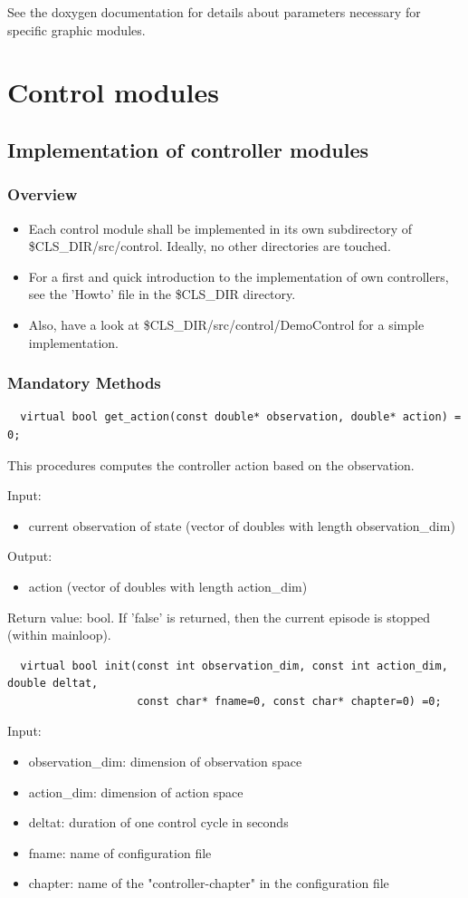 \documentclass[a4paper,12pt,german]{article}
\newcommand{\clsdir}{{\$CLS\_DIR}}
\newcommand{\ite}{\begin{itemize}}
\newcommand{\eti}{\end{itemize}}
\begin{document}
See the doxygen documentation for details about parameters necessary for specific graphic modules.


\section{Control modules}



\subsection{Implementation of controller modules}

\subsubsection{Overview}

\ite
\item Each control module shall be implemented in its own subdirectory of \clsdir/src/control.
Ideally, no other directories are touched.
\item For a first and quick introduction to the implementation of own controllers, 
see the 'Howto' file in the \clsdir{ }  directory.
\item Also, have a look at \clsdir/src/control/DemoControl for a simple implementation.
\eti

\subsubsection{Mandatory Methods}

\begin{verbatim}
  virtual bool get_action(const double* observation, double* action) = 0;
\end{verbatim}

This procedures computes the controller action based on the observation.


Input:
\ite
\item current observation of state (vector of doubles with length observation\_dim)
\eti

Output:
\ite
\item  action (vector of doubles with length action\_dim)
\eti

Return value: bool. If 'false' is returned, then the current episode is stopped (within mainloop).


\begin{verbatim}
  virtual bool init(const int observation_dim, const int action_dim, double deltat, 
                    const char* fname=0, const char* chapter=0) =0;
\end{verbatim}
Input:
\ite
\item observation\_dim: dimension of observation space
\item action\_dim: dimension of action space
\item deltat: duration of one control cycle in seconds
\item fname: name of configuration file
\item chapter: name of the "controller-chapter" in the configuration file 
\eti
\end{document}
